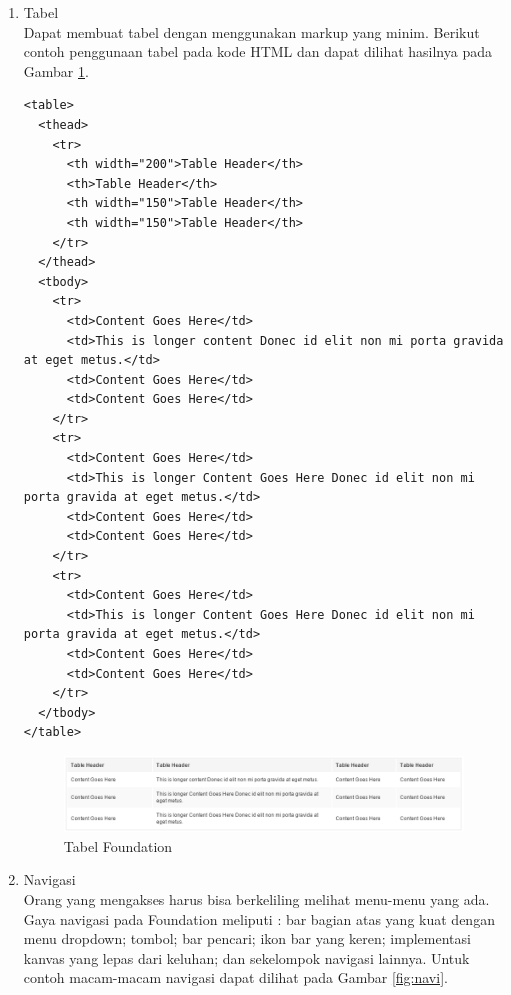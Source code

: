 \begin{enumerate}[(1)]
\item Tabel\\
Dapat membuat tabel dengan menggunakan markup yang minim. Berikut contoh penggunaan tabel pada kode HTML dan dapat dilihat hasilnya pada Gambar \ref{fig:tabel}.
\begin{lstlisting}[basicstyle=\footnotesize]
<table>
  <thead>
    <tr>
      <th width="200">Table Header</th>
      <th>Table Header</th>
      <th width="150">Table Header</th>
      <th width="150">Table Header</th>
    </tr>
  </thead>
  <tbody>
    <tr>
      <td>Content Goes Here</td>
      <td>This is longer content Donec id elit non mi porta gravida at eget metus.</td>
      <td>Content Goes Here</td>
      <td>Content Goes Here</td>
    </tr>
    <tr>
      <td>Content Goes Here</td>
      <td>This is longer Content Goes Here Donec id elit non mi porta gravida at eget metus.</td>
      <td>Content Goes Here</td>
      <td>Content Goes Here</td>
    </tr>
    <tr>
      <td>Content Goes Here</td>
      <td>This is longer Content Goes Here Donec id elit non mi porta gravida at eget metus.</td>
      <td>Content Goes Here</td>
      <td>Content Goes Here</td>
    </tr>
  </tbody>
</table>
\end{lstlisting}
\begin{figure}[H]
\centering
\includegraphics[scale=0.6]{Gambar/tabel.png}
\caption[Tabel Foundation]{Tabel Foundation}
\label{fig:tabel}
\end{figure}
\item Navigasi\\
Orang yang mengakses harus bisa berkeliling melihat menu-menu yang ada. Gaya navigasi pada Foundation meliputi : bar bagian atas yang kuat dengan menu dropdown; tombol; bar pencari; ikon bar yang keren; implementasi kanvas yang lepas dari keluhan; dan sekelompok navigasi lainnya. Untuk contoh macam-macam navigasi dapat dilihat pada Gambar \ref{fig:navi}.
\begin{figure}[ht]
\centering

\end{figure}
\end{enumerate}
